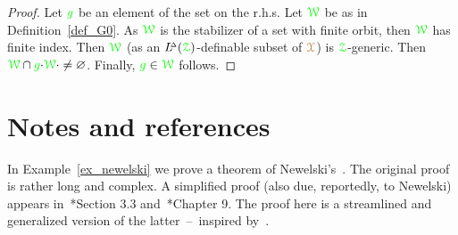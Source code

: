 
\begin{proof}
  Let ${\color{green} g}$ be an element of the set on the r.h.s.
  Let ${\color{green}\EuScript W}$ be as in Definition~\ref{def_G0}.
  As ${\color{green}\EuScript W}$ is the stabilizer of a set with finite orbit, then ${\color{green}\EuScript W}$ has finite index.
  Then ${\color{green}\EuScript W}$ (as an $L\kern-.5ex^{\scriptscriptstyle\Delta}({\color{green}\EuScript Z})$-definable subset of ${\color{brown}\EuScript X}$) is ${\color{green}\EuScript Z}$-generic.
  Then ${\color{green}\EuScript W}\cap{\color{green}g}{\cdot}{\color{green}\EuScript W}{\cdot}\neq\varnothing$.
  Finally, ${\color{green} g}\in{\color{green}\EuScript W}$ follows.
 \end{proof}

\section{Notes and references}

In Example~\ref{ex_newelski} we prove a theorem of Newelski's~\cite{Newelski}.
The original proof is rather long and complex.
A simplified proof (also due, reportedly, to Newelski) appears in~\cite{Pelaez}*{Section 3.3} and~\cite{Casanovas}*{Chapter 9}.
The proof here is a streamlined and generalized version of the latter~--~inspired by~\cite{Z16}.


